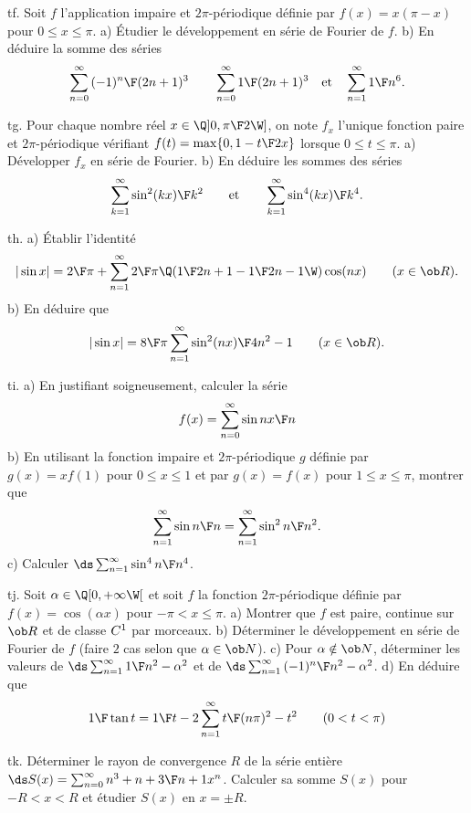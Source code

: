 \exo [Level=2,Fight=0,Learn=0,Type=\Exercices,Field=\SériesDeFourier,Origin=] tf. 
Soit $f$ l'application impaire et $2\pi$-périodique définie par $f(x)=x(\pi-x)$ 
pour $0\le x\le\pi$. \pn
a) \'Etudier le développement en série de Fourier de $f$. \pn
b) En déduire la somme des séries 
$$
\sum_{n=0}^\infty{(-1)^n\F(2n+1)^3}\qquad\sum_{n=0}^\infty{1\F(2n+1)^3}
\quad\hbox{et}\quad\sum_{n=1}^\infty{1\F n^6}. 
$$

\exo [Level=2,Fight=0,Learn=0,Type=\Exercices,Field=\SériesDeFourier,Origin=] tg. 
Pour chaque nombre réel $x\in\Q]0,{\pi\F2}\W]$, on note $f_x$ 
l'unique fonction paire et $2\pi$-périodique vérifiant $f(t)=\max\{0, 1-{t\F2x}\}$ lorsque $0\le t\le \pi$. \pn
a) Développer $f_x$ en série de Fourier.\pn 
b) En déduire les sommes des séries 
$$
\sum_{k=1}^\infty{\sin^2(kx)\F k^2}\qquad\hbox{et}\qquad\sum_{k=1}^\infty{\sin^4(kx)\F k^4}.
$$

\exo [Level=2,Fight=0,Learn=0,Type=\Exercices,Field=\SériesDeFourier,Origin=] th. 
a) \'Etablir l'identité 
$$
|\sin x|={2\F\pi}+\sum_{n=1}^\infty{2\F\pi}\Q({1\F2n+1}-{1\F2n-1}\W)\cos(nx)\qquad(x\in\ob R).
$$
b) En déduire que 
$$
|\sin x|={8\F\pi}\sum_{n=1}^\infty{\sin^2(nx)\F4n^2-1}\qquad(x\in\ob R).
$$  

\exo [Level=2,Fight=0,Learn=0,Type=\Exercices,Field=\SériesDeFourier,Origin=] ti. 
a) En justifiant soigneusement, calculer la série
$$
f(x)=\sum_{n=0}^\infty{\sin nx\F n}
$$
b) En utilisant la fonction impaire et $2\pi$-périodique $g$ définie par 
$g(x)=xf(1)$ pour $0\le x\le 1$ et par $g(x)=f(x)$ pour $1\le x\le \pi$, montrer que 
$$
\sum_{n=1}^\infty{\sin n\F n}=\sum_{n=1}^\infty{\sin^2n\F n^2}. 
$$ 
c) Calculer $\ds \sum_{n=1}^\infty{\sin^4 n\F n^4}$. 

\exo [Level=2,Fight=0,Learn=0,Type=\Exercices,Field=\SériesDeFourier,Origin=] tj. 
Soit $\alpha\in\Q[0,+\infty\W[$ et soit $f$ la fonction $2\pi$-périodique 
définie par $f(x)=\cos (\alpha x)$ 
pour $-\pi< x\le \pi$. \pn
a) Montrer que $f$ est paire, continue sur $\ob R$ et de classe $\sc C^1$ 
par morceaux. \pn
b) Déterminer le développement en série de Fourier de $f$ (faire $2$ 
cas selon que $\alpha\in\ob N$). \pn
c) Pour $\alpha\notin\ob N$, déterminer les valeurs de $\ds \sum_{n=1}^\infty{1\F n^2-\alpha^2}$ 
et de 
$\ds \sum_{n=1}^\infty{(-1)^n\F n^2-\alpha^2}$. \pn
d) En déduire que 
$$
{1\F\tan t}={1\F t}-2\sum_{n=1}^\infty{t\F (n\pi)^2-t^2}\qquad(0<t<\pi)
$$

\exo [Level=2,Fight=0,Learn=0,Type=\Exercices,Field=\SériesEntières,Origin=] tk. 
Déterminer le rayon de convergence $R$ de la série entière 
$\ds S(x)=\sum_{n=0}^\infty{n^3+n+3\F n+1}x^n$. Calculer sa somme $S(x)$ pour $-R<x<R$ 
et étudier $S(x)$ en $x=\pm R$. 

